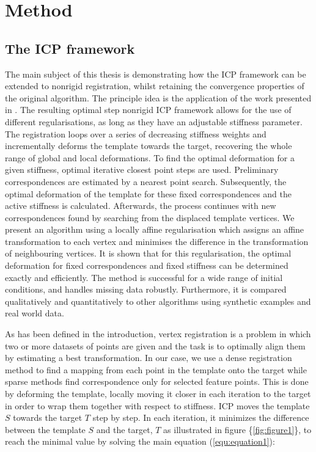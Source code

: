\documentclass[../structure.tex]{subfiles}
\begin{document}
\chapter{Method}
\section{The ICP framework}
\hspace{2em}The main subject of this thesis is demonstrating how the ICP framework can be extended to nonrigid registration, whilst retaining the convergence properties of the original algorithm. The principle idea is the application of the work presented in \cite{Amberg2007}. The resulting optimal step nonrigid ICP framework allows for the use of different regularisations, as long as they have an adjustable stiffness parameter. The registration loops over a series of decreasing stiffness weights and incrementally deforms the template towards the target, recovering the whole range of global and local deformations. To find the optimal deformation for a given stiffness, optimal iterative closest point steps are used. Preliminary correspondences are estimated by a nearest point search. Subsequently, the optimal deformation of the template for these fixed correspondences and the active stiffness is calculated. Afterwards, the process continues with new correspondences found by searching from the displaced template vertices. We present an algorithm using a locally affine regularisation which assigns an affine transformation to each vertex and minimises the difference in the transformation of neighbouring vertices. It is shown that for this regularisation, the optimal deformation for fixed correspondences and fixed stiffness can be determined exactly and efficiently. The method is successful for a wide range of initial conditions, and handles missing data robustly. Furthermore, it is compared qualitatively and quantitatively to other algorithms using synthetic examples and real world data.

\hspace{2em} As has been defined in the introduction, vertex registration is a problem in which two or more datasets of points are given and the task is to optimally align them by estimating a best transformation. In our case, we use a dense registration method to find a mapping from each point in the template onto the target while sparse methods find correspondence only for selected feature points. This is done by deforming the template, locally moving it closer in each iteration to the target in order to wrap them together with respect to stiffness.
\hspace{2em}ICP moves the template $S$ towards the target $T$ step by step. In each iteration, it minimizes the difference between the template $S$ and the target, $T$ as illustrated in figure \{\ref{fig:figure1}\}, to reach the minimal value by solving the main equation (\ref{equ:equation1}):
\end{document}
